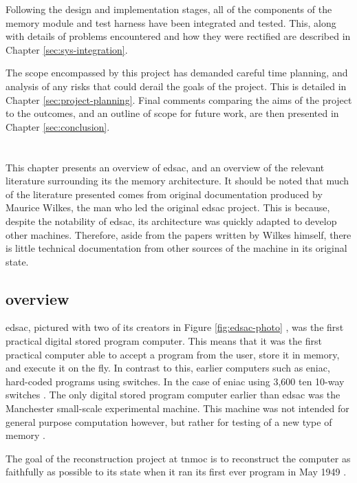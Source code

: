 Following the design and implementation stages, all of the components of the memory module and test harness have been integrated and tested. This, along with details of problems encountered and how they were rectified are described in Chapter \ref{sec:sys-integration}.

The scope encompassed by this project has demanded careful time planning, and analysis of any risks that could derail the goals of the project. This is detailed in Chapter \ref{sec:project-planning}. Final comments comparing the aims of the project to the outcomes, and an outline of scope for future work, are then presented in Chapter \ref{sec:conclusion}.

\chapter{} \label{sec:tech-rev}
This chapter presents an overview of \gls{edsac}, and an overview of the relevant literature surrounding its the memory architecture. It should be noted that much of the literature presented comes from original documentation produced by Maurice Wilkes, the man who led the original \gls{edsac} project. This is because, despite the notability of \gls{edsac}, its architecture was quickly adapted to develop other machines. Therefore, aside from the papers written by Wilkes himself, there is little technical documentation from other sources of the machine in its original state.

\section{ overview} \label{sec:edsac-overview}
\Gls{edsac}, pictured with two of its creators in Figure \ref{fig:edsac-photo} \cite{cam2011}, was the first practical digital stored program computer. This means that it was the first practical computer able to accept a program from the user, store it in memory, and execute it on the fly. In contrast to this, earlier computers such as \gls{eniac}, hard-coded programs using switches. In the case of \gls{eniac} using 3,600 ten 10-way switches \cite{cruz2013}. The only digital stored program computer earlier than \gls{edsac} was the Manchester small-scale experimental machine. This machine was not intended for general purpose computation however, but rather for testing of a new type of memory \cite{jones2001}.

The goal of the reconstruction project at \gls{tnmoc} is to reconstruct the computer as faithfully as possible to its state when it ran its first ever program in May 1949 \cite{nmoc2017}.


